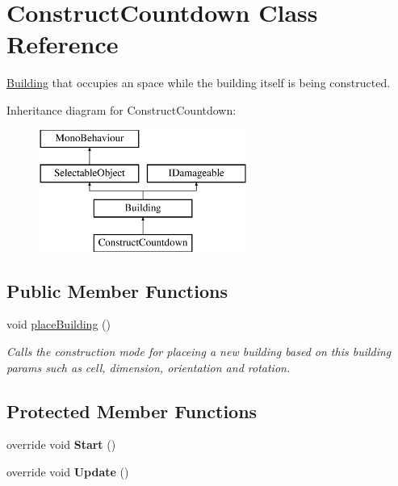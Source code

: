 \hypertarget{class_construct_countdown}{}\section{Construct\+Countdown Class Reference}
\label{class_construct_countdown}


\mbox{\hyperlink{class_building}{Building}} that occupies an space while the building itself is being constructed.  


Inheritance diagram for Construct\+Countdown\+:\begin{figure}[H]
\begin{center}
\leavevmode
\includegraphics[height=4.000000cm]{class_construct_countdown}
\end{center}
\end{figure}
\subsection*{Public Member Functions}
\begin{DoxyCompactItemize}
\item 
void \mbox{\hyperlink{class_construct_countdown_aa9aabcf5c7c48fd7f75a7ab0ecfdef42}{place\+Building}} ()
\begin{DoxyCompactList}\small\item\em Calls the construction mode for placeing a new building based on this building params such as cell, dimension, orientation and rotation. \end{DoxyCompactList}\end{DoxyCompactItemize}
\subsection*{Protected Member Functions}
\begin{DoxyCompactItemize}
\item 
\mbox{\label{class_construct_countdown_a26a4fed12035614c140116871ac44989}} 
override void {\bfseries Start} ()
\item 
\mbox{\label{class_construct_countdown_a1d9dfdaf2f9bfd88f07b94b672ac870d}} 
override void {\bfseries Update} ()
\end{DoxyCompactItemize}
